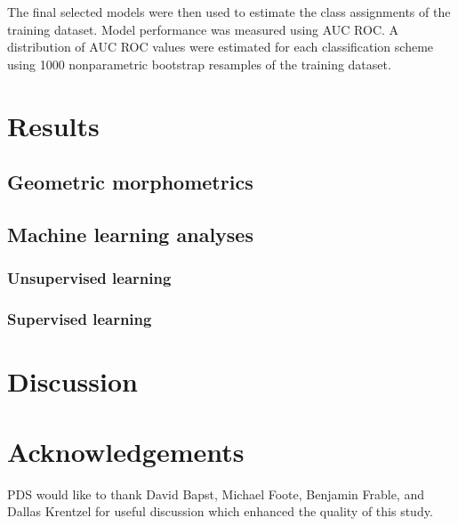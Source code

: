 \documentclass[12pt]{article}\usepackage{graphicx, color}
\begin{document}
The final selected models were then used to estimate the class assignments of the training dataset. Model performance was measured using AUC ROC. A distribution of AUC ROC values were estimated for each classification scheme using 1000 nonparametric bootstrap resamples of the training dataset.

\section{Results}
\subsection{Geometric morphometrics}

\subsection{Machine learning analyses}
\subsubsection{Unsupervised learning}

\subsubsection{Supervised learning}


\section{Discussion}


\section*{Acknowledgements}
PDS would like to thank David Bapst, Michael Foote, Benjamin Frable, and Dallas Krentzel for useful discussion which enhanced the quality of this study.



\end{document}
